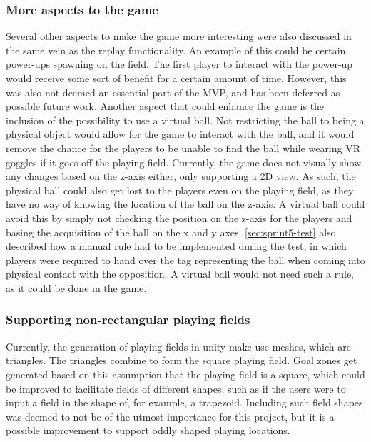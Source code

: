 \subsubsection{More aspects to the game}
Several other aspects to make the game more interesting were also discussed in the same vein as the replay functionality.
An example of this could be certain power-ups spawning on the field.
The first player to interact with the power-up would receive some sort of benefit for a certain amount of time.
However, this was also not deemed an essential part of the MVP, and has been deferred as possible future work.
Another aspect that could enhance the game is the inclusion of the possibility to use a virtual ball.
Not restricting the ball to being a physical object would allow for the game to interact with the ball, and it would remove the chance for the players to be unable to find the ball while wearing VR goggles if it goes off the playing field.
Currently, the game does not visually show any changes based on the z-axis either, only supporting a 2D view.
As such, the physical ball could also get lost to the players even on the playing field, as they have no way of knowing the location of the ball on the z-axis.
A virtual ball could avoid this by simply not checking the position on the z-axis for the players and basing the acquisition of the ball on the x and y axes.
\autoref{sec:sprint5-test} also described how a manual rule had to be implemented during the test, in which players were required to hand over the tag representing the ball when coming into physical contact with the opposition.
A virtual ball would not need such a rule, as it could be done in the game.

\subsubsection{Supporting non-rectangular playing fields}
Currently, the generation of playing fields in unity make use meshes, which are triangles.
The triangles combine to form the square playing field.
Goal zones get generated based on this assumption that the playing field is a square, which could be improved to facilitate fields of different shapes, such as if the users were to input a field in the shape of, for example, a trapezoid.
Including such field shapes was deemed to not be of the utmost importance for this project, but it is a possible improvement to support oddly shaped playing locations.

